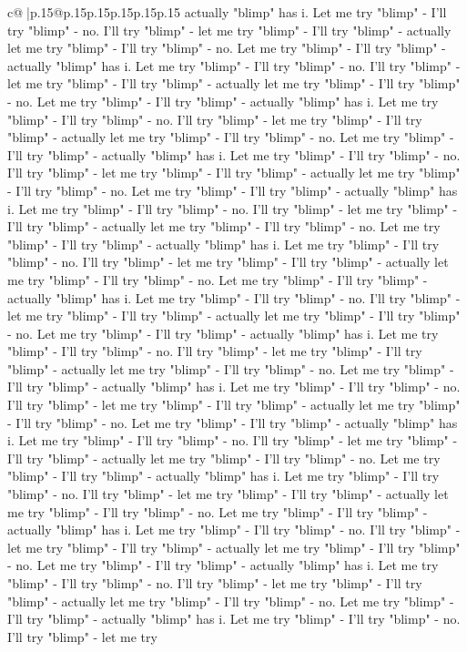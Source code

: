 \documentclass{article}
\begin{document}
{\begin{supertabular}{c@{$\;$}|p{.15\linewidth}@{}p{.15\linewidth}p{.15\linewidth}p{.15\linewidth}p{.15\linewidth}p{.15\linewidth}}
{{{actually "blimp" has i. Let me try "blimp" {-} I'll try "blimp" {-} no. I'll try "blimp" {-} let me try "blimp" {-} I'll try "blimp" {-} actually let me try "blimp" {-} I'll try "blimp" {-} no. Let me try "blimp" {-} I'll try "blimp" {-} actually "blimp" has i. Let me try "blimp" {-} I'll try "blimp" {-} no. I'll try "blimp" {-} let me try "blimp" {-} I'll try "blimp" {-} actually let me try "blimp" {-} I'll try "blimp" {-} no. Let me try "blimp" {-} I'll try "blimp" {-} actually "blimp" has i. Let me try "blimp" {-} I'll try "blimp" {-} no. I'll try "blimp" {-} let me try "blimp" {-} I'll try "blimp" {-} actually let me try "blimp" {-} I'll try "blimp" {-} no. Let me try "blimp" {-} I'll try "blimp" {-} actually "blimp" has i. Let me try "blimp" {-} I'll try "blimp" {-} no. I'll try "blimp" {-} let me try "blimp" {-} I'll try "blimp" {-} actually let me try "blimp" {-} I'll try "blimp" {-} no. Let me try "blimp" {-} I'll try "blimp" {-} actually "blimp" has i. Let me try "blimp" {-} I'll try "blimp" {-} no. I'll try "blimp" {-} let me try "blimp" {-} I'll try "blimp" {-} actually let me try "blimp" {-} I'll try "blimp" {-} no. Let me try "blimp" {-} I'll try "blimp" {-} actually "blimp" has i. Let me try "blimp" {-} I'll try "blimp" {-} no. I'll try "blimp" {-} let me try "blimp" {-} I'll try "blimp" {-} actually let me try "blimp" {-} I'll try "blimp" {-} no. Let me try "blimp" {-} I'll try "blimp" {-} actually "blimp" has i. Let me try "blimp" {-} I'll try "blimp" {-} no. I'll try "blimp" {-} let me try "blimp" {-} I'll try "blimp" {-} actually let me try "blimp" {-} I'll try "blimp" {-} no. Let me try "blimp" {-} I'll try "blimp" {-} actually "blimp" has i. Let me try "blimp" {-} I'll try "blimp" {-} no. I'll try "blimp" {-} let me try "blimp" {-} I'll try "blimp" {-} actually let me try "blimp" {-} I'll try "blimp" {-} no. Let me try "blimp" {-} I'll try "blimp" {-} actually "blimp" has i. Let me try "blimp" {-} I'll try "blimp" {-} no. I'll try "blimp" {-} let me try "blimp" {-} I'll try "blimp" {-} actually let me try "blimp" {-} I'll try "blimp" {-} no. Let me try "blimp" {-} I'll try "blimp" {-} actually "blimp" has i. Let me try "blimp" {-} I'll try "blimp" {-} no. I'll try "blimp" {-} let me try "blimp" {-} I'll try "blimp" {-} actually let me try "blimp" {-} I'll try "blimp" {-} no. Let me try "blimp" {-} I'll try "blimp" {-} actually "blimp" has i. Let me try "blimp" {-} I'll try "blimp" {-} no. I'll try "blimp" {-} let me try "blimp" {-} I'll try "blimp" {-} actually let me try "blimp" {-} I'll try "blimp" {-} no. Let me try "blimp" {-} I'll try "blimp" {-} actually "blimp" has i. Let me try "blimp" {-} I'll try "blimp" {-} no. I'll try "blimp" {-} let me try "blimp" {-} I'll try "blimp" {-} actually let me try "blimp" {-} I'll try "blimp" {-} no. Let me try "blimp" {-} I'll try "blimp" {-} actually "blimp" has i. Let me try "blimp" {-} I'll try "blimp" {-} no. I'll try "blimp" {-} let me try "blimp" {-} I'll try "blimp" {-} actually let me try "blimp" {-} I'll try "blimp" {-} no. Let me try "blimp" {-} I'll try "blimp" {-} actually "blimp" has i. Let me try "blimp" {-} I'll try "blimp" {-} no. I'll try "blimp" {-} let me try }}}
\end{supertabular}}
\end{document}
